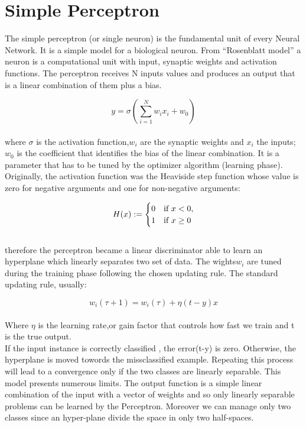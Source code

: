 \documentclass[a4paper, 10pt]{book}
\newcommand{\quotes}[1]{``#1''}
\begin{document}
\section{Simple Perceptron}

The simple perceptron (or single neuron) is the fundamental unit of every Neural Network.
It is a simple  model for a biological neuron. From \quotes{Rosenblatt  model}
a neuron is a computational unit with input, synaptic weights and activation  functions. The perceptron receives N inputs values and produces an output that is a linear combination of them plus a bias.


\begin{equation}\label{eqn:perceptron}
     y = \sigma ( \sum\limits_{i=1}^N w_i x_i +w_0) 
\end{equation} 
\\
where $\sigma$ is the activation function,$
w_i$ are the synaptic weights and $x_i$ the inputs;
$w_0$ is the coefficient that identifies the bias of the linear combination. It is a parameter that has to be tuned by the optimizer algorithm (learning phase). Originally, the activation function was the Heaviside step function whose value is zero for negative arguments and one for non-negative arguments:

        \begin{equation}
            \label{eqn:Heaviside}
         {\displaystyle H(x) := \begin{cases}0 &{\text{if }}$$x< 0$$,\\1 &{\text{if }} x\ge 0 \end{cases}}
            \end{equation} 
\\        
therefore the perceptron became a linear discriminator able to learn an hyperplane which linearly separates two set of data.
The wights$ w_i$ are tuned during the training phase following the chosen updating rule. The standard updating rule, usually:

\begin{equation}
    \label{eqn:standard_updating_rule}
w_i (\tau +1) = w_i (\tau) + \eta(t - y)x 
\end{equation}
\\
Where $\eta$ is the learning rate,or gain factor that controls how fast we train and t is the true output.
\\
If the input instance is correctly classified , the error(t-y) is zero.
Otherwise, the hyperplane is moved towords the missclassified example.
Repeating this process will lead to a convergence only if the two classes are linearly separable. This model presents numerous limits. The output function is a simple linear combination of the input with a vector of weights and so only linearly separable problems can be learned  by the Perceptron. Moreover we can manage only two classes since an hyper-plane divide the space in only two half-spaces.
\end{document}
